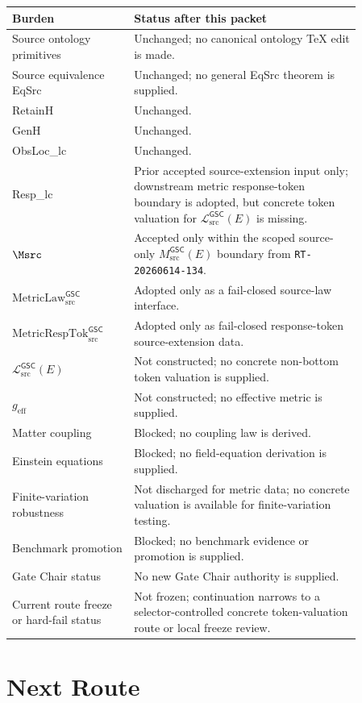 \documentclass[11pt]{article}
\newcommand{\MsrcGSC}{M_{\mathrm{src}}^{\mathsf{GSC}}}
\newcommand{\MetricLaw}{\mathrm{MetricLaw}_{\mathrm{src}}^{\mathsf{GSC}}}
\newcommand{\MetricRespTok}{\mathrm{MetricRespTok}_{\mathrm{src}}^{\mathsf{GSC}}}
\newcommand{\MetricData}{\mathcal{L}_{\mathrm{src}}^{\mathsf{GSC}}}
\newcommand{\geff}{g_{\mathrm{eff}}}
\begin{document}
\begin{longtable}{p{0.30\linewidth}p{0.56\linewidth}}
\toprule
Burden & Status after this packet \\
\midrule
Source ontology primitives & Unchanged; no canonical ontology TeX edit is made. \\
Source equivalence EqSrc & Unchanged; no general EqSrc theorem is supplied. \\
RetainH & Unchanged. \\
GenH & Unchanged. \\
ObsLoc\_lc & Unchanged. \\
Resp\_lc & Prior accepted source-extension input only; downstream metric
response-token boundary is adopted, but concrete token valuation for
\(\MetricData(E)\) is missing. \\
\(\Msrc\) & Accepted only within the scoped source-only \(\MsrcGSC(E)\)
boundary from \texttt{RT-20260614-134}. \\
\(\MetricLaw\) & Adopted only as a fail-closed source-law interface. \\
\(\MetricRespTok\) & Adopted only as fail-closed response-token
source-extension data. \\
\(\MetricData(E)\) & Not constructed; no concrete non-bottom token valuation
is supplied. \\
\(\geff\) & Not constructed; no effective metric is supplied. \\
Matter coupling & Blocked; no coupling law is derived. \\
Einstein equations & Blocked; no field-equation derivation is supplied. \\
Finite-variation robustness & Not discharged for metric data; no concrete
valuation is available for finite-variation testing. \\
Benchmark promotion & Blocked; no benchmark evidence or promotion is supplied. \\
Gate Chair status & No new Gate Chair authority is supplied. \\
Current route freeze or hard-fail status & Not frozen; continuation narrows
to a selector-controlled concrete token-valuation route or local freeze
review. \\
\bottomrule
\end{longtable}

\section{Next Route}
\end{document}
